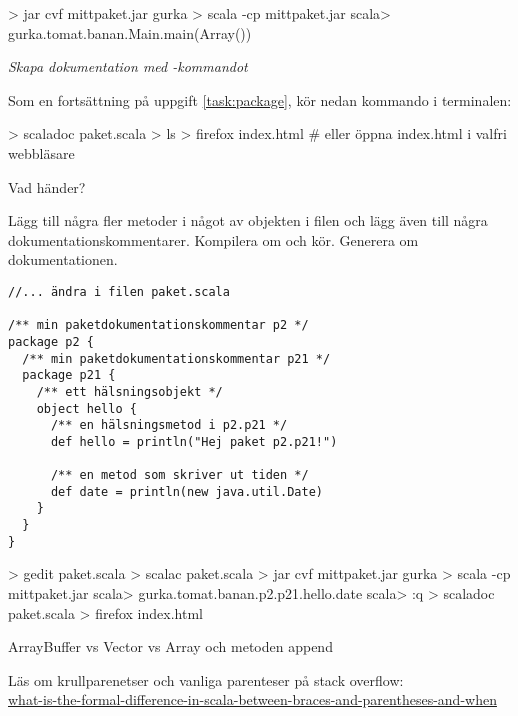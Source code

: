 \begin{REPL}
> jar cvf mittpaket.jar gurka
> scala -cp mittpaket.jar
scala> gurka.tomat.banan.Main.main(Array())
\end{REPL}

 
\Task \emph{Skapa dokumentation med -kommandot}

\Subtask Som en fortsättning på uppgift \ref{task:package}, kör nedan kommando i terminalen:

\begin{REPL}
> scaladoc paket.scala
> ls
> firefox index.html   # eller öppna index.html i valfri webbläsare
\end{REPL}

Vad händer?

\Subtask Lägg till några fler metoder i något av objekten i filen  och lägg även till några dokumentationskommentarer. Kompilera om och kör. Generera om dokumentationen. 

\begin{verbatim}
//... ändra i filen paket.scala

/** min paketdokumentationskommentar p2 */
package p2 {
  /** min paketdokumentationskommentar p21 */
  package p21 {
    /** ett hälsningsobjekt */
    object hello {
      /** en hälsningsmetod i p2.p21 */
      def hello = println("Hej paket p2.p21!")
      
      /** en metod som skriver ut tiden */
      def date = println(new java.util.Date)
    }
  }
}

\end{verbatim}

\begin{REPL}
> gedit paket.scala
> scalac paket.scala
> jar cvf mittpaket.jar gurka
> scala -cp mittpaket.jar
scala> gurka.tomat.banan.p2.p21.hello.date
scala> :q
> scaladoc paket.scala
> firefox index.html
\end{REPL}

\ExtraTasks %



\AdvancedTasks %


\Task ArrayBuffer vs Vector vs Array och metoden append

\Task Läs om krullparenetser och vanliga parenteser på stack overflow: \\ \href{http://stackoverflow.com/questions/4386127/what-is-the-formal-difference-in-scala-between-braces-and-parentheses-and-when}{what-is-the-formal-difference-in-scala-between-braces-and-parentheses-and-when}

